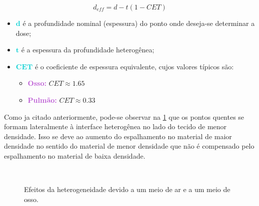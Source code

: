 \documentclass[11pt,a4paper]{article}
\newcounter{exemplo}
\begin{document}
	\begin{equation}
		d_{eff} = d - t(1 - CET)
	\end{equation}

	\begin{exemplo}
		\begin{itemize}
			\item \textcolor{DarkTurquoise}{$\mathbf{d}$} é a profundidade nominal (espessura) do ponto onde deseja-se determinar a dose;
			\item \textcolor{DarkTurquoise}{$\mathbf{t}$} é a espessura da profundidade heterogênea;
			\item \textcolor{DarkTurquoise}{$\mathbf{CET}$} é o coeficiente de espessura equivalente, cujos valores típicos são:
				\begin{itemize}[label=\textcolor{CarnationPink}{$\star$}]
					\item \textcolor{MediumOrchid}{\textbf{Osso:}} $CET \approx 1.65$
					\item \textcolor{MediumOrchid}{\textbf{Pulmão:}} $CET \approx 0.33$
				\end{itemize}
		\end{itemize}
	\end{exemplo}

	Como ja citado anteriormente, pode-se observar na \ref{fig:heterogeneidade}  que os pontos quentes se formam lateralmente à interface heterogênea no lado do tecido de menor densidade. Isso se deve ao aumento do espalhamento no material de maior densidade no sentido do material de menor densidade que não é compensado pelo espalhamento no material de baixa densidade.

	\begin{figure}[h]
		\centering
		 \\ %
		\caption{Efeitos da heterogeneidade devido a um meio de ar e a um meio de osso.}
		\label{fig:heterogeneidade}
	\end{figure}
\end{document}
